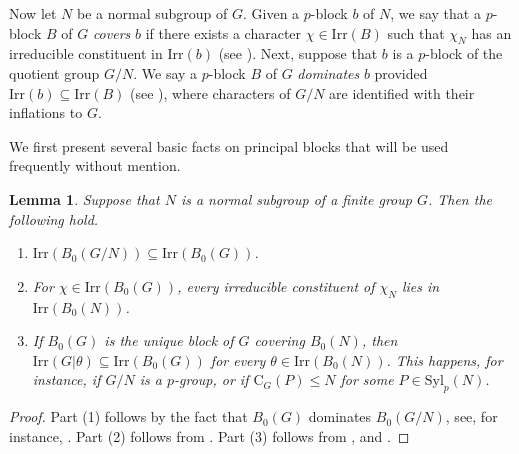 \documentclass[10pt]{article}
\newtheorem{lem}{\bf Lemma}[section]
\begin{document}
Now let $N$ be a normal subgroup of $G$.
Given a $p$-block $b$ of $N$, we say that a $p$-block $B$ of $G$ \emph{covers} $b$ if there exists a character $\chi \in \mathrm{Irr}(B)$ 
such that $\chi_N$ has an irreducible constituent in $\mathrm{Irr}(b)$ (see \cite[Theorem 9.2]{navarro98}).
Next, suppose that $b$ is a $p$-block of the quotient group $G/N$.
We say a $p$-block $B$ of $G$ \emph{dominates} $b$ provided $\mathrm{Irr}(b) \subseteq \mathrm{Irr}(B)$ (see \cite[Ch.5, Lemma 8.6]{nagao89}), where characters of $G/N$ are identified with their inflations to $G$.








We first present several basic facts on principal blocks that will be used frequently without mention. 



\begin{lem}\label{lem: basics on principal blocks}
  Suppose that $N$ is a normal subgroup of a finite group $G$. 
  Then the following hold.
  \begin{enumerate}[\rm (1)]
      \item $\mathrm{Irr}(B_0(G/N))\subseteq \mathrm{Irr}(B_0(G))$.
  \item For $\chi \in \mathrm{Irr}(B_0(G))$, every irreducible constituent of $\chi_N$ lies in $\mathrm{Irr}(B_0(N))$.
  \item If $B_0(G)$ is the unique block of $G$ covering $B_0(N)$, then $\mathrm{Irr}(G|\theta) \subseteq \mathrm{Irr}(B_0(G))$ for every $\theta \in \mathrm{Irr}(B_0(N))$.
    This happens, for instance, if $G/N$ is a $p$-group, or if $\mathrm{C}_G(P)\leq N$ for some $P\in \mathrm{Syl}_{p}(N)$.
  \end{enumerate}
\end{lem}
\begin{proof}
  Part (1) follows by the fact that $B_0(G)$ dominates $B_0(G/N)$, see, for instance, \cite[Pages 198,199]{navarro98}. 
  Part (2) follows from  \cite[Theorem 9.2]{navarro98}.
  Part (3) follows from \cite[Corollary 9.6]{navarro98}, \cite[Theorem 6.7]{navarro98} and \cite[Lemma 3.1]{navarro12}.
\end{proof}
\end{document}
